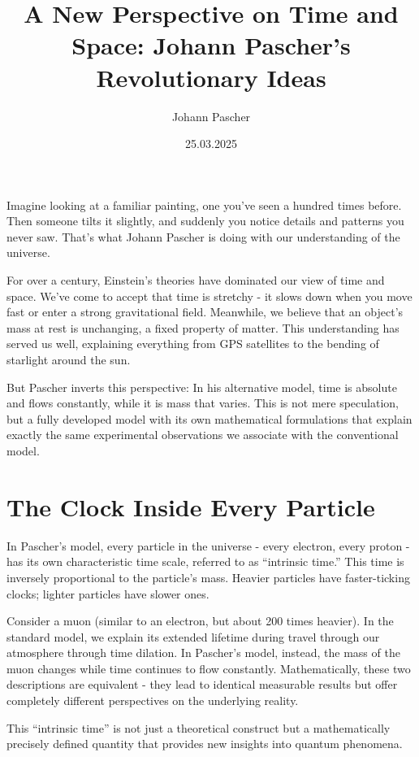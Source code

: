 \documentclass[a4paper,12pt]{article}
\title{A New Perspective on Time and Space: Johann Pascher's Revolutionary Ideas}
\author{Johann Pascher}
\date{25.03.2025}
\begin{document}
	\maketitle
	
	Imagine looking at a familiar painting, one you've seen a hundred times before. Then someone tilts it slightly, and suddenly you notice details and patterns you never saw. That's what Johann Pascher is doing with our understanding of the universe.
	
	For over a century, Einstein's theories have dominated our view of time and space. We've come to accept that time is stretchy - it slows down when you move fast or enter a strong gravitational field. Meanwhile, we believe that an object's mass at rest is unchanging, a fixed property of matter. This understanding has served us well, explaining everything from GPS satellites to the bending of starlight around the sun.
	
	But Pascher inverts this perspective: In his alternative model, time is absolute and flows constantly, while it is mass that varies. This is not mere speculation, but a fully developed model with its own mathematical formulations that explain exactly the same experimental observations we associate with the conventional model.
	
	\section{The Clock Inside Every Particle}
	
	In Pascher's model, every particle in the universe - every electron, every proton - has its own characteristic time scale, referred to as ``intrinsic time.'' This time is inversely proportional to the particle's mass. Heavier particles have faster-ticking clocks; lighter particles have slower ones.
	
	Consider a muon (similar to an electron, but about 200 times heavier). In the standard model, we explain its extended lifetime during travel through our atmosphere through time dilation. In Pascher's model, instead, the mass of the muon changes while time continues to flow constantly. Mathematically, these two descriptions are equivalent - they lead to identical measurable results but offer completely different perspectives on the underlying reality.
	
	This ``intrinsic time'' is not just a theoretical construct but a mathematically precisely defined quantity that provides new insights into quantum phenomena.
	
\end{document}
